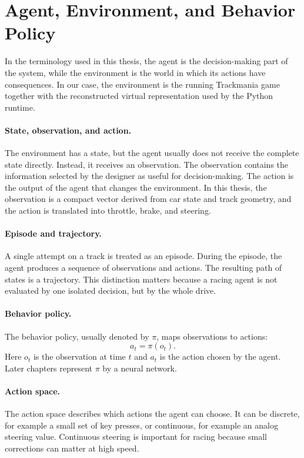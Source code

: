\section{Agent, Environment, and Behavior Policy}

In the terminology used in this thesis, the agent is the decision-making part of the system, while the environment is the world in which its actions have consequences. In our case, the environment is the running Trackmania game together with the reconstructed virtual representation used by the Python runtime.

\paragraph{State, observation, and action.}
The environment has a state, but the agent usually does not receive the complete state directly. Instead, it receives an observation. The observation contains the information selected by the designer as useful for decision-making. The action is the output of the agent that changes the environment. In this thesis, the observation is a compact vector derived from car state and track geometry, and the action is translated into throttle, brake, and steering.

\paragraph{Episode and trajectory.}
A single attempt on a track is treated as an episode. During the episode, the agent produces a sequence of observations and actions. The resulting path of states is a trajectory. This distinction matters because a racing agent is not evaluated by one isolated decision, but by the whole drive.

\paragraph{Behavior policy.}
The behavior policy, usually denoted by \(\pi\), maps observations to actions:
\[
    a_t = \pi(o_t).
\]
Here \(o_t\) is the observation at time \(t\) and \(a_t\) is the action chosen by the agent. Later chapters represent \(\pi\) by a neural network.

\paragraph{Action space.}
The action space describes which actions the agent can choose. It can be discrete, for example a small set of key presses, or continuous, for example an analog steering value. Continuous steering is important for racing because small corrections can matter at high speed.

